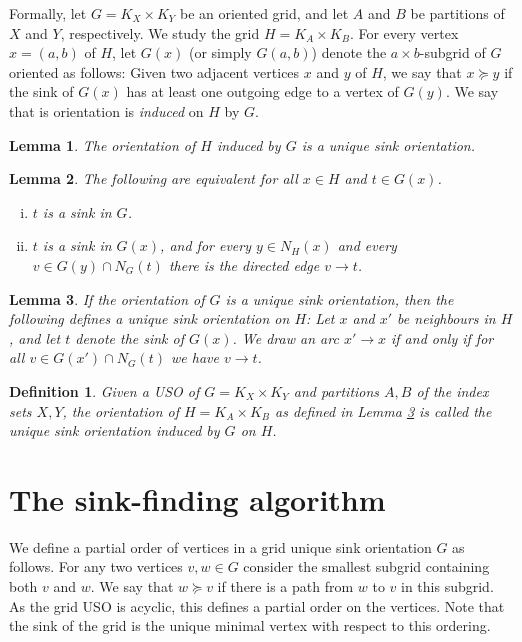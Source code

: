 \documentclass[a4paper,10pt]{article}
\newtheorem{lemma}{Lemma}
\newtheorem{definition}{Definition}
\begin{document}
Formally, let $G = K_X \times K_Y$ be an oriented grid,
and let $A$ and $B$ be partitions of $X$ and $Y$, respectively.
We study the grid $H = K_A \times K_B$.
For every vertex $x = (a,b)$ of $H$, let $G(x)$ (or simply $G(a,b)$)
denote the $a \times b$-subgrid of $G$ oriented as follows:
Given two adjacent vertices $x$ and $y$ of $H$, we say that $x\succeq y$ if the sink of $G(x)$ has at least one outgoing edge to a vertex of $G(y)$. We say that is orientation is \emph{induced} on $H$ by $G$.

\begin{lemma}
The orientation of $H$ induced by $G$ is a unique sink orientation.
\end{lemma}


\begin{lemma}
    The following are equivalent for all $x \in H$ and $t \in G(x)$.
        \begin{enumerate}[(i)]
            \item
                $t$ is a sink in $G$.
            \item
                $t$ is a sink in $G(x)$, and for every $y \in N_H(x)$ and
                every $v \in G(y) \cap N_G(t)$ there is the directed edge
                $v \to t$.
        \end{enumerate}
\end{lemma}

\begin{lemma}
    \label{lemma:induced}
    If the orientation of $G$ is a unique sink orientation,
    then the following defines a unique sink orientation on $H$:
    Let $x$ and $x'$ be neighbours in $H$, and let $t$ denote the sink of
    $G(x)$.
    We draw an arc $x' \to x$ if and only if for all
    $v \in G(x') \cap N_G(t)$ we have $v \to t$.
\end{lemma}

\begin{definition}
    Given a USO of $G = K_X \times K_Y$ and partitions $A,B$ of the index sets
    $X,Y$, the orientation of $H = K_A \times K_B$
    as defined in Lemma \ref{lemma:induced} is called the \emph{unique
    sink orientation induced by $G$ on $H$}.
\end{definition}

\section{The sink-finding algorithm}

We define a partial order of vertices in a grid unique sink orientation $G$ as follows. For any two vertices $v,w \in G$ consider the smallest subgrid containing both $v$ and $w$. We say that $w \succeq v$ if there is a path from $w$ to $v$ in this subgrid. As the grid USO is acyclic, this defines a partial order on the vertices. Note that the sink of the grid is the unique minimal vertex with respect to this ordering. 
\end{document}
